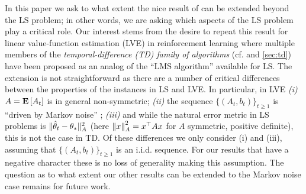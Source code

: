 In this paper we ask to what extent the nice result 
of \citet{bach-moulines} can be extended beyond the LS problem;
in other words, we are asking which aspects of the LS problem play a critical role. 
Our interest stems from the desire to repeat this result for
linear value-function estimation (LVE) in reinforcement learning where
multiple members of the
\emph{temporal-difference (TD) family of algorithms} 
(cf. \cite{sutton,gtd,gtd2,gtdmp} and \cref{sec:td})
have been proposed as an analog of the ``LMS algorithm'' available for LS.
The extension is not straightforward as there are a number of critical differences
between the properties of the instances in LS and LVE.
In particular,  in LVE
{\em (i)}  $A=\mathbf{E}\left[A_t\right]$ is in general non-symmetric;
{\em (ii)} the sequence  $\{(A_t,b_t)\}_{t\ge 1}$ is ``driven by Markov noise'' \cite{tsivan95,tsivan97};
{\em (iii)} and while the natural error metric in LS problems is $\| \hat{\theta}_t-\theta_*\|_{A}^2$
(here $\left\| x\right\|_A^2 = x^\top A x$ for $A$ symmetric, positive definite), 
this is not the case in TD.
Of these differences we only consider (i) and (iii), assuming that $\{(A_t,b_t)\}_{t\ge 1}$ is an i.i.d. sequence. For our results that have a negative character these is no loss of generality
making this assumption. 
The question as to what extent our other results can be extended to the Markov noise
case remains for future work. 

\iffalse
\if0
In particular, the convergence rates can degrade, or they may depend on potentially unbounded problem dependent constants \cite{bach-moulines}. Diminishing stepsizes such as $\alpha_t=\frac{c_0}{t+c}$, with problem instance specific tuning of the constants $c>0,c_0>0$ have been used in practice \cite{gtd2,gtdmp,konda-tsitsiklis}. 
An alternate idea, which we call the constant stepsize averaged LSA (CALSA) is to run \eqref{eq:lsaintro} by choosing $\alpha_t=\alpha>0$ $\forall t> 0$ with some $\alpha>0$, and output the average $\thh_t\eqdef\frac{1}{t+1}\sum_{s=0}^t \theta_s$. Thus, in CALSA, $\theta_t$ is an internal variable and $\thh_t$ is the output of the algorithm. The idea is that the constant stepsize leads to faster forgetting of initial conditions, while the averaging on the top reduces noise. This idea goes back to  \citet{ruppert} and \citet{polyak-judisky} who proposed it in the context of stochastic approximation that LSA is a special case of.   
\fi

